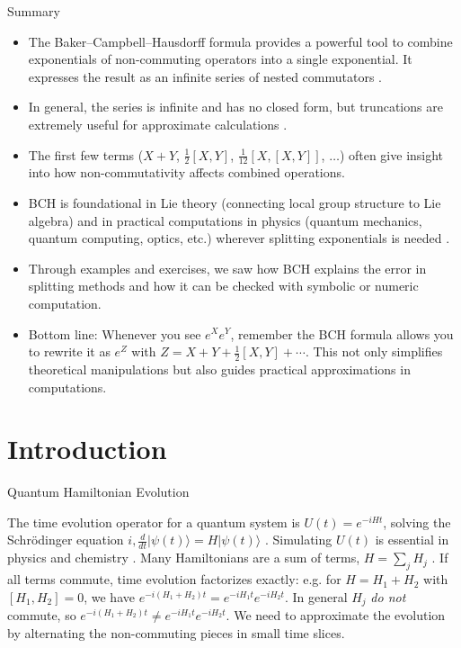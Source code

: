 \documentclass{beamer}
\begin{document}
\begin{frame}{Summary}
\begin{itemize}
\item The Baker–Campbell–Hausdorff formula provides a powerful tool to combine exponentials of non-commuting operators into a single exponential. It expresses the result as an infinite series of nested commutators .
\item In general, the series is infinite and has no closed form, but truncations are extremely useful for approximate calculations .
\item The first few terms ($X+Y$, $\frac{1}{2}[X,Y]$, $\frac{1}{12}[X,[X,Y]]$, $\dots$) often give insight into how non-commutativity affects combined operations.
\item BCH is foundational in Lie theory (connecting local group structure to Lie algebra) and in practical computations in physics (quantum mechanics, quantum computing, optics, etc.) wherever splitting exponentials is needed .
\item Through examples and exercises, we saw how BCH explains the error in splitting methods and how it can be checked with symbolic or numeric computation.
\item Bottom line: Whenever you see $e^X e^Y$, remember the BCH formula allows you to rewrite it as $e^Z$ with $Z = X+Y + \frac{1}{2}[X,Y] + \cdots$. This not only simplifies theoretical manipulations but also guides practical approximations in computations.
\end{itemize}
\end{frame}


\section{Introduction}

\begin{frame}{Quantum Hamiltonian Evolution}

The time evolution operator for a quantum system is $U(t)=e^{-iHt}$, solving the Schrödinger equation $i,\frac{d}{dt}|\psi(t)\rangle = H|\psi(t)\rangle$ . Simulating $U(t)$ is essential in physics and chemistry .
Many Hamiltonians are a sum of terms, $H=\sum_j H_j$ . If all terms commute, time evolution factorizes exactly: e.g. for $H=H_1+H_2$ with $[H_1,H_2]=0$, we have $e^{-i(H_1+H_2)t}=e^{-iH_1 t}e^{-iH_2 t}$.
In general $H_j$ \textit{do not} commute, so $e^{-i(H_1+H_2)t}\neq e^{-iH_1t}e^{-iH_2t}$. We need to approximate the evolution by alternating the non-commuting pieces in small time slices. \end{frame}
\end{document}
